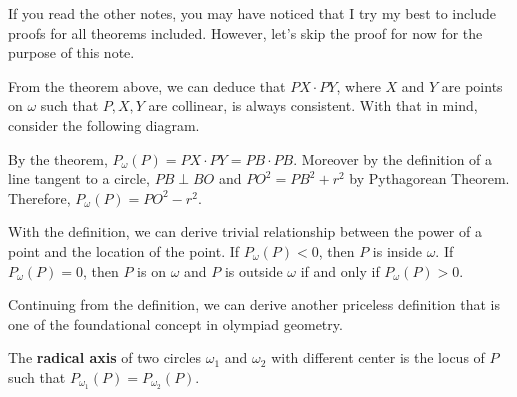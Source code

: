 \documentclass[../../main.tex]{subfiles}
\begin{document}
If you read the other notes, you may have noticed that I try my
best to include proofs for all theorems included. However, let's
skip the proof for now for the purpose of this note.

From the theorem above, we can deduce that $PX \cdot PY$, where
$X$ and $Y$ are points on $\omega$ such that $P, X, Y$ are collinear,
is always consistent. With that in mind, consider the following
diagram.

\begin{figure}[H]
\centering
{}
\end{figure}

By the theorem, $P_\omega(P) = PX \cdot PY = PB \cdot PB$. Moreover
by the definition of a line tangent to a circle, $PB \perp BO$ and
$PO^2 = PB^2 + r^2$ by Pythagorean Theorem. Therefore, $P_\omega(P)
= PO^2 - r^2$.

\begin{important}
With the definition, we can derive trivial relationship between
the power of a point and the location of the point.
If $P_\omega(P) < 0$, then $P$ is inside $\omega$.
If $P_\omega(P) = 0$, then $P$ is on $\omega$ and $P$ is outside
$\omega$ if and only if $P_\omega(P) > 0$.
\end{important}

Continuing from the definition, we can derive another priceless
definition that is one of the foundational concept in olympiad
geometry.

\begin{definition}{}{}
The \textbf{radical axis} of two circles $\omega_1$ and $\omega_2$
with different center is the locus of $P$ such that $P_{\omega_1}(P)
= P_{\omega_2}(P)$.
\end{definition}
\end{document}
